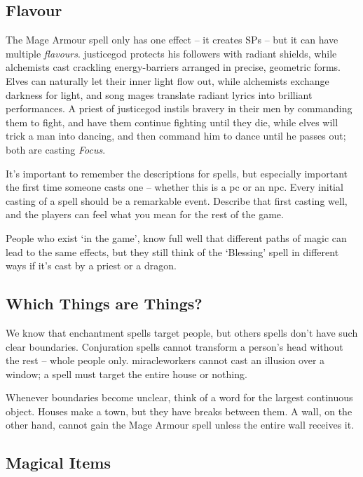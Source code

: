 \begin{multicols}{2}

\subsection{Flavour}

The Mage Armour spell only has one effect -- it creates \glspl{SP} -- but it can have multiple \textit{flavours}.
\Gls{justicegod} protects his followers with radiant shields, while alchemists cast crackling energy-barriers arranged in precise, geometric forms.
Elves can naturally let their inner light flow out, while alchemists exchange darkness for light, and song mages translate radiant lyrics into brilliant performances.
A priest of \gls{justicegod} instils bravery in their men by commanding them to fight, and have them continue fighting until they die, while elves will trick a man into dancing, and then command him to dance until he passes out; both are casting \textit{Focus}.

It's important to remember the descriptions for spells, but especially important the first time someone casts one -- whether this is a \gls{pc} or an \gls{npc}.
Every initial casting of a spell should be a remarkable event.
Describe that first casting well, and the players can feel what you mean for the rest of the game.

People who exist `in the game', know full well that different paths of magic can lead to the same effects, but they still think of the `Blessing' spell in different ways if it's cast by a priest or a dragon.

\subsection{Which Things are Things?}

We know that enchantment spells target people, but others spells don't have such clear boundaries.
Conjuration spells cannot transform a person's  head without the rest -- whole people only.
\Glspl{miracleworker} cannot cast an illusion over a window; a spell must target the entire house or nothing.

Whenever boundaries become unclear, think of a word for the largest continuous object.
Houses make a town, but they have breaks between them.
A wall, on the other hand, cannot gain the Mage Armour spell unless the entire wall receives it.

\subsection{Magical Items}


\end{multicols}
